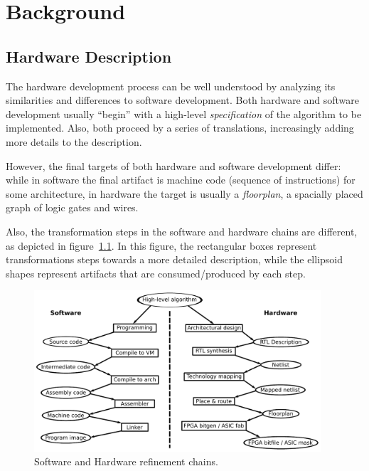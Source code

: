 \chapter{Background}
\label{chap:background}

    \section{Hardware Description}
    \label{sec:hardware-description}
        The hardware development process can be well understood by analyzing its
        similarities and differences to software development.
        Both hardware and software development usually ``begin'' with a high-level \emph{specification}
        of the algorithm to be implemented.
        Also, both proceed by a series of translations, increasingly adding more details to the description.

        However, the final targets of both hardware and software development differ:
        while in software the final artifact is machine code (sequence of instructions) for some architecture,
        in hardware the target is usually a \emph{floorplan}, a spacially placed graph of logic gates and wires.

        Also, the transformation steps in the software and hardware chains are different,
        as depicted in figure~\ref{fig:sw-hw-chains}.
        In this figure, the rectangular boxes represent transformations steps towards a more detailed description,
        while the ellipsoid shapes represent artifacts that are consumed/produced by each step.

        \begin{figure}[h]
            \centerline{\includegraphics[width=0.95\textwidth]{imgs/sw-hw-chains.pdf}}
            \caption{Software and Hardware refinement chains. \label{fig:sw-hw-chains}}
        \end{figure}

